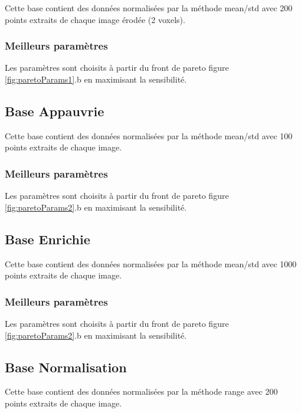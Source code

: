 Cette base contient des données normalisées par la méthode mean/std avec 200 points extraits de chaque image érodée (2 voxels).

\subsubsection{Meilleurs paramètres}

Les paramètres sont choisits à partir du front de pareto figure \ref{fig:paretoParams1}.b en maximisant la sensibilité.


\subsection{Base Appauvrie}

Cette base contient des données normalisées par la méthode mean/std avec 100 points extraits de chaque image.

\subsubsection{Meilleurs paramètres}

Les paramètres sont choisits à partir du front de pareto figure \ref{fig:paretoParams2}.b en maximisant la sensibilité.




\subsection{Base Enrichie}

Cette base contient des données normalisées par la méthode mean/std avec 1000 points extraits de chaque image.

\subsubsection{Meilleurs paramètres}

Les paramètres sont choisits à partir du front de pareto figure \ref{fig:paretoParams2}.b en maximisant la sensibilité.





\subsection{Base Normalisation}

Cette base contient des données normalisées par la méthode range avec 200 points extraits de chaque image.


